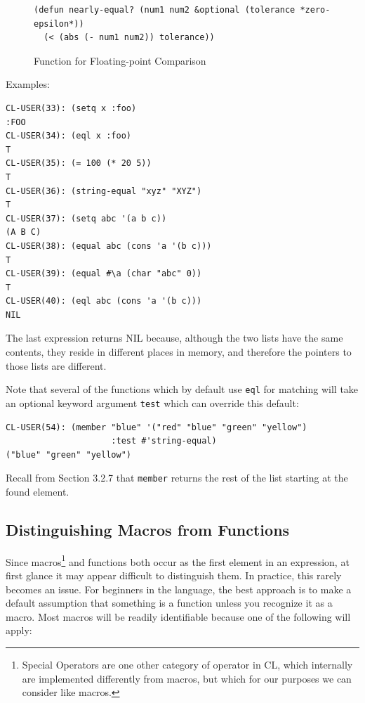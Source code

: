 \begin{figure}[h]
\begin{verbatim}
(defun nearly-equal? (num1 num2 &optional (tolerance *zero-epsilon*))
  (< (abs (- num1 num2)) tolerance))
\end{verbatim}
\caption{Function for Floating-point Comparison}
\label{fig:nearly-equal}
\end{figure}

Examples:

\begin{verbatim}
CL-USER(33): (setq x :foo)
:FOO
CL-USER(34): (eql x :foo)
T
CL-USER(35): (= 100 (* 20 5))
T
CL-USER(36): (string-equal "xyz" "XYZ")
T
CL-USER(37): (setq abc '(a b c))
(A B C)
CL-USER(38): (equal abc (cons 'a '(b c)))
T
CL-USER(39): (equal #\a (char "abc" 0))
T
CL-USER(40): (eql abc (cons 'a '(b c)))
NIL
\end{verbatim}

The last expression returns NIL because, although the two lists have the same contents, they
reside in different places in memory, and therefore the pointers to those lists are different.

Note that several of the functions which by default use \texttt{eql} for matching will take an
optional keyword argument \texttt{test} which can override this default:

\begin{verbatim}
CL-USER(54): (member "blue" '("red" "blue" "green" "yellow")
                     :test #'string-equal)
("blue" "green" "yellow")
\end{verbatim}

Recall from Section 3.2.7 that \texttt{member} returns the rest of the list starting at the found
element.

\subsection{Distinguishing Macros from Functions}

Since macros\footnote{Special Operators are one other category of operator in CL, which internally are implemented differently
from macros, but which for our purposes we can consider like macros.} and functions both occur as the first element in an expression, at first
glance it may appear difficult to distinguish them. In practice, this rarely becomes an issue.
For beginners in the language, the best approach is to make a default assumption that
something is a function unless you recognize it as a macro. Most macros will be readily
identifiable because one of the following will apply:


